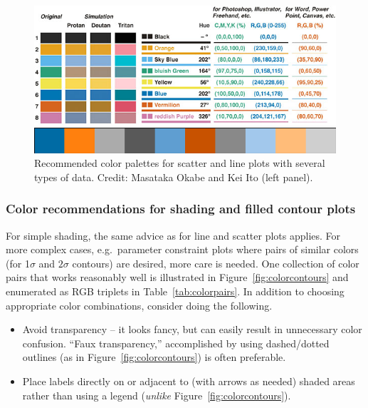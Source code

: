 \documentclass[letterpaper,11pt]{article}
\begin{document}
\begin{figure} 
 \includegraphics[scale=1.15]{figures/pallete}
 \hspace{1cm}
 \begin{minipage}[b]{0.5\textwidth}
   \includegraphics[scale=0.55]{figures/ColorBlind_10_discrete}\vspace{10mm}
 \end{minipage}
 \caption{Recommended color palettes for scatter and line plots with several types of data. Credit: Masataka Okabe and Kei Ito (left panel).}
 \label{fig:palettes}
\end{figure}

\subsubsection{Color recommendations for shading and filled contour plots}

For simple shading, the same advice as for line and scatter plots applies. For more complex cases, e.g.\ parameter constraint plots where pairs of similar colors (for 1$\sigma$ and $2\sigma$ contours) are desired, more care is needed. One collection of color pairs that works reasonably well is illustrated in Figure~\ref{fig:colorcontours} and enumerated as RGB triplets in Table~\ref{tab:colorpairs}. In addition to choosing appropriate color combinations, consider doing the following.
\begin{itemize}
\item Avoid transparency -- it looks fancy, but can easily result in unnecessary color confusion. ``Faux transparency,'' accomplished by using dashed/dotted outlines (as in Figure~\ref{fig:colorcontours}) is often preferable.
\item Place labels directly on or adjacent to (with arrows as needed) shaded areas rather than using a legend (\emph{unlike} Figure~\ref{fig:colorcontours}).
\end{itemize}
\end{document}
